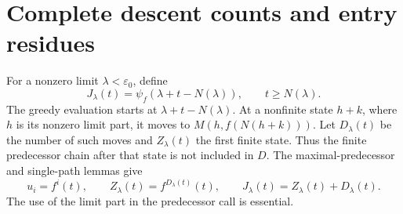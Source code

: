 \section{Complete descent counts and entry residues}\label{sec:residues}

For a nonzero limit \(\lambda<\varepsilon_0\), define
\[
 J_\lambda(t)=\psi_f(\lambda+t-N(\lambda)),
 \qquad t\ge N(\lambda).
\]
The greedy evaluation starts at \(\lambda+t-N(\lambda)\).  At a
nonfinite state \(h+k\), where \(h\) is its nonzero limit part, it
moves to \(M(h,f(N(h+k)))\).  Let \(D_\lambda(t)\) be the number
of such moves and \(Z_\lambda(t)\) the first finite state.  Thus the
finite predecessor chain after that state is not included in \(D\).
The maximal-predecessor and single-path lemmas give
\begin{equation}\label{eq:terminal-decomposition}
 u_i=f^i(t),\qquad Z_\lambda(t)=f^{D_\lambda(t)}(t),\qquad
 J_\lambda(t)=Z_\lambda(t)+D_\lambda(t).
\end{equation}
The use of the limit part in the predecessor call is essential.

